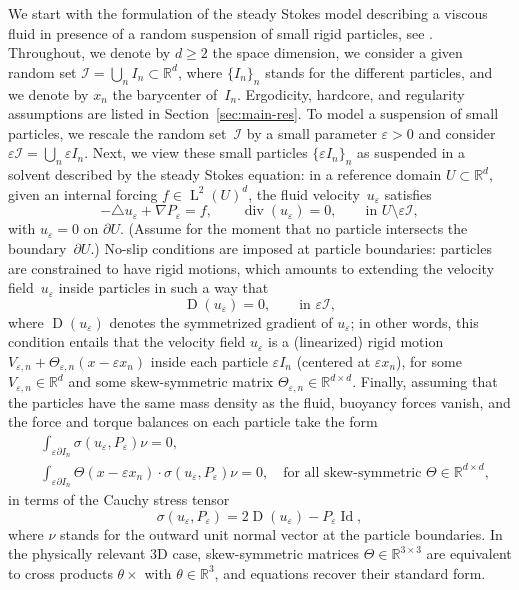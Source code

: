 \documentclass[JEP,XML,SOM,Unicode,published]{cedram}
\let\mathcal\mathscr
\newcounter{assumption}
\theoremstyle{plain}
\theoremstyle{definition}
\newcommand{\e}{\varepsilon}
\newcommand{\R}{\mathbb R}
\newcommand{\Ic}{\mathcal I}
\newcommand{\Id}{\operatorname{Id}}
\newcommand{\D}{\operatorname{D}}
\newcommand{\Ld}{\operatorname{L}}
\newcommand{\Div}{{\operatorname{div}}}
\begin{document}
We start with the formulation of the steady Stokes model describing a viscous fluid in presence of a random suspension of small rigid particles, see \eg \cite{DG-19}.
Throughout, we denote by $d\ge 2$ the space dimension, we consider a given random set $\Ic=\bigcup_nI_n\subset\R^d$, where $\{I_n\}_n$ stands for the different particles, and we denote by $x_n$ the barycenter of~$I_n$. Ergodicity, hardcore, and regularity assumptions are listed in Section~\ref{sec:main-res}.
To model a suspension of small particles, we rescale the random set~$\Ic$ by a small parameter $\e>0$ and consider $\e\Ic=\bigcup_n\e I_n$.
Next, we view these small particles $\{\e I_n\}_n$ as suspended in a solvent described by the steady Stokes equation: in a reference domain $U\subset\R^d$, given an internal forcing $f\in \Ld^2(U)^d$, the fluid velocity~$u_\e$ satisfies
\begin{equation}\label{e.intro1}
-\triangle u_\e+\nabla P_\e=f,\qquad\Div( u_\e)=0,\qquad\text{in $U\setminus\e\Ic$},
\end{equation}
with $u_\e=0$ on $\partial U$.
(Assume for the moment that no particle intersects the boundary~$\partial U$.)
No-slip conditions are imposed at particle boundaries: particles are constrained to have rigid motions, which amounts to extending the velocity field~$u_\e$ inside particles in such a way that
\begin{equation*}\label{e.intro+2}
\D(u_\e)=0,\qquad\text{in $\e\Ic$},
\end{equation*}
where $\D(u_\e)$ denotes the symmetrized gradient of $u_\e$; in other words, this condition entails that the velocity field $u_\e$ is a (linearized) rigid motion $V_{\e,n}+\Theta_{\e,n}(x-\e x_n)$ inside each particle $\e I_n$ (centered at $\e x_n$), for some $V_{\e,n}\in\R^d$ and some skew-symmetric matrix $\Theta_{\e,n}\in\R^{d\times d}$.
Finally, assuming that the particles have the same mass density as the fluid, buoyancy forces vanish, and
the force and torque balances on each particle take the form
\begin{align}
&\int_{\e\partial I_n}\sigma(u_\e,P_\e)\nu=0,\label{eq:force-bal}\\
&\int_{\e\partial I_n}\Theta(x-\e x_n)\cdot\sigma(u_\e,P_\e)\nu=0,\quad\text{for all skew-symmetric $\Theta\in\R^{d\times d}$},\label{e.intro+3}
\end{align}
in terms of the Cauchy stress tensor
\begin{equation}\label{eq:Cauchy}
\sigma(u_\e,P_\e)=2\D(u_\e)-P_\e\Id,
\end{equation}
where $\nu$ stands for the outward unit normal vector at the particle boundaries.
In the physically relevant 3D case, skew-symmetric matrices $\Theta\in\R^{3\times 3}$ are equivalent to cross products $\theta\times$ with $\theta\in\R^3$, and equations recover their standard form.
\end{document}
